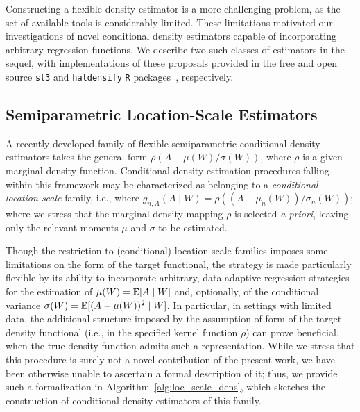 Constructing a flexible density estimator is a more challenging problem, as the
set of available tools is considerably limited. These limitations motivated our
investigations of novel conditional density estimators capable of incorporating
arbitrary regression functions. We describe two such classes of estimators in
the sequel, with implementations of these proposals provided in the free and
open source \texttt{sl3} and \texttt{haldensify} \texttt{R}
packages~\citep{coyle2021sl3, hejazi2021haldensify}, respectively.

\subsection{Semiparametric Location-Scale Estimators}\label{hose_hese_est}

A recently developed family of flexible semiparametric conditional density
estimators takes the general form $\rho(A - \mu(W) / \sigma(W))$, where $\rho$
is a given marginal density function. Conditional density estimation procedures
falling within this framework may be characterized as belonging to
a \textit{conditional location-scale} family, i.e., where $g_{n,A}(A \mid W)
= \rho((A - \mu_n(W)) / \sigma_n(W))$; where we stress that the marginal density
mapping $\rho$ is selected \textit{a priori}, leaving only the relevant moments
$\mu$ and $\sigma$ to be estimated.

Though the restriction to (conditional) location-scale families imposes some
limitations on the form of the target functional, the strategy is made
particularly flexible by its ability to incorporate arbitrary, data-adaptive
regression strategies for the estimation of $\mu(W) = \mathbb{E}[A \mid W]$ and,
optionally, of the conditional variance $\sigma(W) = \mathbb{E}[(A - \mu(W))^2 \mid W]$.
In particular, in settings with limited data, the additional structure imposed
by the assumption of form of the target density functional (i.e., in the
specified kernel function $\rho$) can prove beneficial, when the true density
function admits such a representation. While we stress that this procedure is
surely not a novel contribution of the present work, we have been otherwise
unable to ascertain a formal description of it; thus, we provide such
a formalization in Algorithm~\ref{alg:loc_scale_dens}, which sketches the
construction of conditional density estimators of this family.\\

